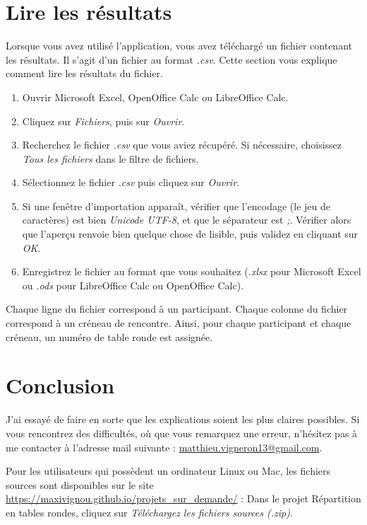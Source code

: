 \documentclass[11pt,a4paper]{article}
\newcommand{\nomproduit}{Répartition en tables rondes}
\begin{document}
\section{Lire les résultats}
\label{sec:resultats}
Lorsque vous avez utilisé l'application, vous avez téléchargé un fichier contenant les résultats. Il s'agit d'un fichier au format \textit{.csv}. Cette section vous explique comment lire les résultats du fichier.
\begin{enumerate}
  \item Ouvrir Microsoft Excel, OpenOffice Calc ou LibreOffice Calc.
  \item Cliquez sur \textit{Fichiers}, puis sur \textit{Ouvrir}.
  \item Recherchez le fichier \textit{.csv} que vous aviez récupéré. Si nécessaire, choisissez \textit{Tous les fichiers} dans le filtre de fichiers.
  \item Sélectionnez le fichier \textit{.csv} puis cliquez sur \textit{Ouvrir}.
  \item Si une fenêtre d'importation apparaît, vérifier que l'encodage (le jeu de caractères) est bien \textit{Unicode UTF-8}, et que le séparateur est \textit{;}. Vérifier alors que l'aperçu renvoie bien quelque chose de lisible, puis validez en cliquant sur \textit{OK}.
  \item Enregistrez le fichier au format que vous souhaitez (\textit{.xlsx} pour Microsoft Excel ou \textit{.ods} pour LibreOffice Calc ou OpenOffice Calc).
\end{enumerate}
Chaque ligne du fichier correspond à un participant. Chaque colonne du fichier correspond à un créneau de rencontre. Ainsi, pour chaque participant et chaque créneau, un numéro de table ronde est assignée.

\section{Conclusion}
\label{sec:conclusion}
J'ai essayé de faire en sorte que les explications soient les plus claires possibles. Si vous rencontrez des difficultés, où que vous remarquez une erreur, n'hésitez pas à me contacter à l'adresse mail suivante : \href{mailto:matthieu.vigneron13@gmail.com}{matthieu.vigneron13@gmail.com}. \begin{note} Pour les utilisateurs qui possèdent un ordinateur Linux ou Mac, les fichiers sources sont disponibles sur le site \url{https://maxivignou.github.io/projets_sur_demande/} : Dans le projet \nomproduit{}, cliquez sur \textit{Téléchargez les fichiers sources (.zip)}. \end{note}
\end{document}

